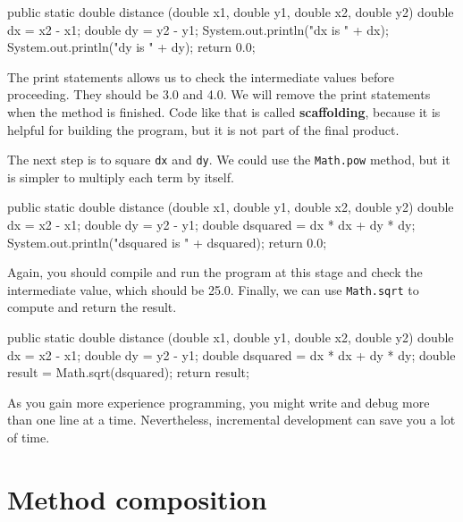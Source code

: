 \documentclass[12pt]{book}
\theoremstyle{exercise}
\newcommand{\java}[1]{\verb"#1"}
\begin{document}
\begin{code}
    public static double distance
            (double x1, double y1, double x2, double y2) {
        double dx = x2 - x1;
        double dy = y2 - y1;
        System.out.println("dx is " + dx);
        System.out.println("dy is " + dy);
        return 0.0;
    }
\end{code}


The print statements allows us to check the intermediate values before proceeding.
They should be 3.0 and 4.0.
We will remove the print statements when the method is finished.
Code like that is called {\bf scaffolding}, because it is helpful for building the program, but it is not part of the final product.

The next step is to square \java{dx} and \java{dy}.
We could use the \java{Math.pow} method, but it is simpler to multiply each term by itself.

\begin{code}
    public static double distance
            (double x1, double y1, double x2, double y2) {
        double dx = x2 - x1;
        double dy = y2 - y1;
        double dsquared = dx * dx + dy * dy;
        System.out.println("dsquared is " + dsquared);
        return 0.0;
    }
\end{code}

Again, you should compile and run the program at this stage and check the intermediate value, which should be 25.0.
Finally, we can use \java{Math.sqrt} to compute and return the result.

\begin{code}
    public static double distance
            (double x1, double y1, double x2, double y2) {
        double dx = x2 - x1;
        double dy = y2 - y1;
        double dsquared = dx * dx + dy * dy;
        double result = Math.sqrt(dsquared);
        return result;
    }
\end{code}


As you gain more experience programming, you might write and debug more than one line at a time.
Nevertheless, incremental development can save you a lot of time.


\section{Method composition}
\end{document}
